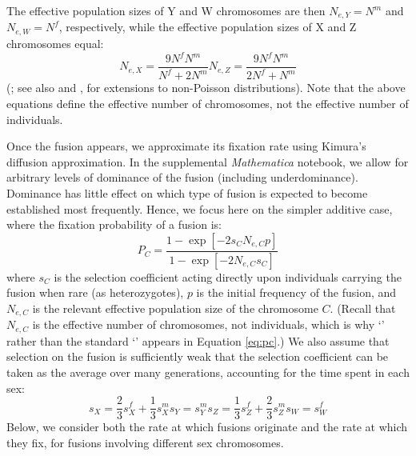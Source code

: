The effective population sizes of Y and W chromosomes are then $N_{e,Y}=N^m$ and $N_{e,W}=N^f$, respectively, while the effective population sizes of X and Z chromosomes equal:
\begin{subequations}
\begin{equation}
N_{e,X} = \frac{\text{9}N^fN^m}{N^f + \text{2}N^m}
\end{equation}
\begin{equation}
N_{e,Z} = \frac{\text{9}N^fN^m}{\text{2}N^f + N^m}
\end{equation}
\end{subequations}
(\citealp{Wright1933}; see also \citealp{Caballero1995} and  \citealp{Laporte2002}, for extensions to non-Poisson distributions). Note that the above equations define the effective number of chromosomes, not the effective number of individuals.

Once the fusion appears, we approximate its fixation rate using Kimura's \citeyearpar{Kimura1962} diffusion approximation. In the supplemental \emph{Mathematica} notebook, we allow for arbitrary levels of dominance of the fusion (including underdominance). Dominance has little effect on which type of fusion is expected to become established most frequently. Hence, we focus here on the simpler additive case, where the fixation probability of a fusion is:
\begin{equation}\label{eq:pc}
P_C = \frac{\text{1} - \exp[-\text{2}s_C N_{e,C}p]}{\text{1} - \exp[-\text{2}N_{e,C}s_C ]}
\end{equation}
where $s_C$ is the selection coefficient acting directly upon individuals carrying the fusion when rare (as heterozygotes), $p$ is the initial frequency of the fusion, and $N_{e,C}$ is the relevant effective population size of the chromosome $C$. (Recall that $N_{e,C}$ is the effective number of chromosomes, not individuals, which is why `' rather than the standard `' appears in Equation \ref{eq:pc}.) We also assume that selection on the fusion is sufficiently weak that the selection coefficient can be taken as the average over many generations, accounting for the time spent in each sex:
\begin{subequations}
\begin{equation}
s_X = \frac{\text{2}}{\text{3}}s^f_X + \frac{\text{1}}{\text{3}}s^m_X
\end{equation}
\begin{equation}
s_Y = s^m_Y
\end{equation}
\begin{equation}
s_Z = \frac{\text{1}}{\text{3}}s^f_Z + \frac{\text{2}}{\text{3}}s^m_Z
\end{equation}
\begin{equation}
s_W = s^f_W
\end{equation}
\end{subequations}
Below, we consider both the rate at which fusions originate and the rate at which they fix, for fusions involving different sex chromosomes.

